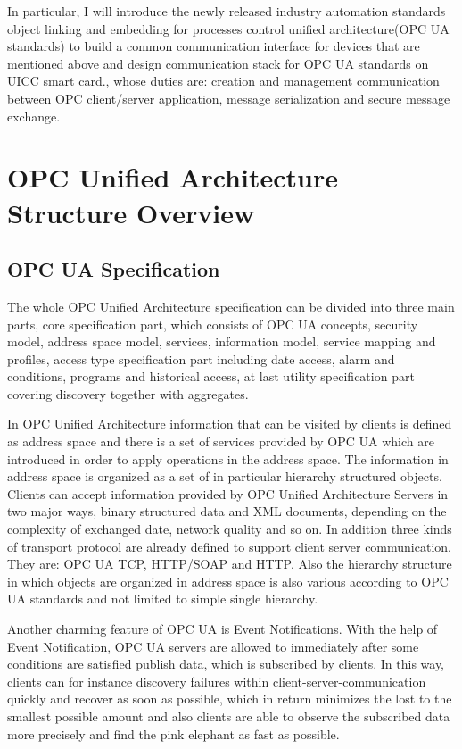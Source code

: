 \documentclass[]{llncs}
\begin{document}
In particular, I will introduce the newly released industry automation standards object linking and embedding for processes control unified architecture(OPC UA standards) to build a common communication interface for devices that are mentioned above and design communication stack for OPC UA standards on UICC smart card., whose  duties are: creation and management communication between OPC client/server application, message serialization and secure message exchange.


\section{OPC Unified Architecture Structure Overview }

\subsection{OPC UA Specification}

The whole OPC Unified Architecture specification can be divided into three main parts, core specification part, which consists of OPC UA concepts, security model, address space model, services, information model, service mapping and profiles, access type specification part including date access, alarm and conditions, programs and historical access, at last utility specification part covering discovery together with aggregates. 


In OPC Unified Architecture information that can be visited by clients is defined as address space\cite{O3} and there is a set of services\cite{O4} provided by OPC UA which are introduced in order to apply operations in the address space. The information in address space is organized as a set of in particular hierarchy structured objects. Clients can accept information provided by OPC Unified Architecture Servers in two major ways, binary structured data and XML documents, depending on the complexity of exchanged date, network quality and so on. In addition three kinds of transport protocol are already defined to support client server communication. They are: OPC UA TCP, HTTP/SOAP and HTTP. Also the hierarchy structure in which objects are organized in address space is also various according to OPC UA standards and not limited to simple single hierarchy.   


Another charming feature of OPC UA is Event Notifications. With the help of Event Notification, OPC UA servers are allowed to immediately after some conditions are satisfied publish data, which is subscribed by clients. In this way, clients can for instance discovery failures within client-server-communication quickly and recover as soon as possible, which in return minimizes the lost to the smallest possible amount and also clients are able to observe the subscribed data more precisely and find the pink elephant as fast as possible.
\end{document}
